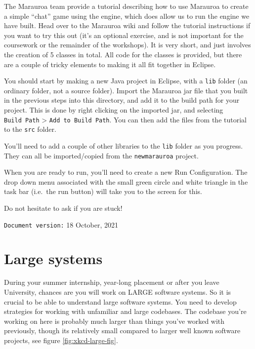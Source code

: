 \documentclass[
]{book}
\begin{document}
The Marauroa team provide a tutorial describing how to use Marauroa to create a simple ``chat'' game using the engine, which does allow us to run the engine we have built. Head over to the Marauroa wiki and follow the tutorial instructions if you want to try this out (it's an optional exercise, and is not important for the coursework or the remainder of the workshops). It is very short, and just involves the creation of 5 classes in total. All code for the classes is provided, but there are a couple of tricky elements to making it all fit together in Eclipse.

You should start by making a new Java project in Eclipse, with a \texttt{lib} folder (an ordinary folder, not a source folder). Import the Marauroa jar file that you built in the previous steps into this directory, and add it to the build path for your project. This is done by right clicking on the imported jar, and selecting \texttt{Build\ Path} \textgreater{} \texttt{Add\ to\ Build\ Path}. You can then add the files from the tutorial to the \texttt{src} folder.

You'll need to add a couple of other libraries to the \texttt{lib} folder as you progress. They can all be imported/copied from the \texttt{newmarauroa} project.

When you are ready to run, you'll need to create a new Run Configuration. The drop down menu associated with the small green circle and white triangle in the task bar (i.e.~the run button) will take you to the screen for this.

Do not hesitate to ask if you are stuck!

\texttt{Document\ version:} 18 October, 2021

\hypertarget{understanding}{%
\chapter{Large systems}\label{understanding}}

During your summer internship, year-long placement or after you leave University, chances are you will work on LARGE software systems. So it is crucial to be able to understand large software systems. You need to develop strategies for working with unfamiliar and large codebases. The codebase you're working on here is probably much larger than things you've worked with previously, though its relatively small compared to larger well known software projects, see figure \ref{fig:xkcd-large-fig}.
\end{document}
